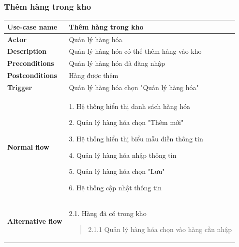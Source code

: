         \subsubsection{Thêm hàng trong kho}
        {
\setlength\extrarowheight{6pt}
            \begin{longtable}{| p{} | p{} |} 
                \hline
                    \textbf{Use-case name} 
                & 
                    Thêm hàng trong kho
                \\
                \hline
                    \textbf{Actor} 
                & 
                    Quản lý hàng hóa
                \\
                \hline
                    \textbf{Description} 
                & 
                    Quản lý hàng hóa có thể thêm hàng vào kho
                \\
                \hline
                    \textbf{Preconditions} 
                &
                    Quản lý hàng hóa đã đăng nhập
                \\
                \hline
                    \textbf{Postconditions} 
                & 
                    Hàng được thêm
                \\
                \hline
                    \textbf{Trigger} 
                & 
                    Quản lý hàng hóa chọn "Quản lý hàng hóa"
                \\
                \hline
                \begin{flushleft}
                    \textbf{Normal flow}
                \end{flushleft}
                & 
                1. Hệ thống hiển thị danh sách hàng hóa
                    
                    2. Quản lý hàng hóa chọn "Thêm mới"
                    
                    3. Hệ thống hiển thị biểu mẫu điền thông tin
                    
                    4. Quản lý hàng hóa nhập thông tin
                    
                    5. Quản lý hàng hóa chọn "Lưu"
                    
                    6. Hệ thống cập nhật thông tin
                \\
                \hline
                \begin{flushleft}
                    \textbf{Alternative flow}
                \end{flushleft}
                &
                2.1. Hàng đã có trong kho
                    \begin{quote} 
                    2.1.1 Quản lý hàng hóa chọn vào hàng cần nhập
                        

\end{quote}
\end{longtable}}
